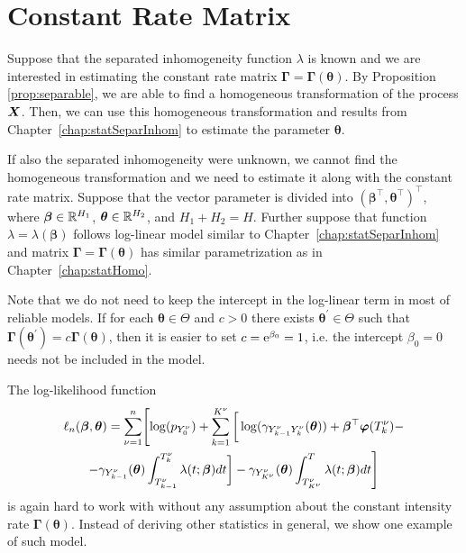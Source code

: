 {\section{Constant Rate Matrix}

Suppose that the separated inhomogeneity function $\lambda$ is known and we are interested in estimating the constant rate matrix $\bm{\Gamma} = \bm{\Gamma} (\bm{\theta})$. By Proposition \ref{prop:separable}, we are able to find a homogeneous transformation of the process $\bm{X}$. Then, we can use this homogeneous transformation and results from Chapter~\ref{chap:statSeparInhom} to estimate the parameter $\bm{\theta}$.

If also the separated inhomogeneity were unknown, we cannot find the homogeneous transformation and we need to estimate it along with the constant rate matrix. Suppose that the vector parameter is divided into $(\bm{\beta}^{\top}, \bm{\theta}^{\top})^{\top}$, where $\bm{\beta} \in \mathbb{R}^{H_1}$, $\bm{\theta} \in \mathbb{R}^{H_2}$, and $H_1 + H_2 = H$. Further suppose that function $\lambda = \lambda (\bm{\beta})$ follows log-linear model similar to Chapter~\ref{chap:statSeparInhom} and matrix $\bm{\Gamma} = \bm{\Gamma} (\bm{\theta})$ has similar parametrization as in Chapter~\ref{chap:statHomo}.

Note that we do not need to keep the intercept in the log-linear term in most of reliable models. If for each $\bm{\theta} \in \Theta$ and $c > 0$ there exists $\bm{\theta}^{'} \in \Theta$ such that $\bm{\Gamma} (\bm{\theta}^{'}) = c \bm{\Gamma} ( \bm{\theta} )$, then it is easier to set $c = \operatorname{\mathrm{e}}^{\beta_0} = 1$, i.e. the intercept $\beta_0 = 0$ needs not be included in the model.

The log-likelihood function
\begin{multline*}
	\ell_n (\bm{\beta}, \bm{\theta})
	= \sum_{\nu=1}^n \Biggl[ \log( p_{Y_0^{\nu}}) +
	\sum_{k=1}^{K^{\nu}} \bigg[ \log(\gamma_{Y_{k-1}^{\nu} Y_{k}^{\nu}} (\bm{\theta})) + \bm{\beta}^\top \bm{\varphi} (T_k^{\nu}) - \\
	- \gamma_{Y_{k-1}^{\nu}} (\bm{\theta}) \int_{T_{k-1}^{\nu}}^{T_k^{\nu}} \lambda(t; \bm{\beta}) dt \bigg] -
	\gamma_{Y_{K^{\nu}}^{\nu}} (\bm{\theta}) \int_{T_{K^{\nu}}^{\nu}}^{T} \lambda(t; \bm{\beta}) dt \Biggr]
\end{multline*}
is again hard to work with without any assumption about the constant intensity rate $\bm{\Gamma} (\bm{\theta})$. Instead of deriving other statistics in general, we show one example of such model.

}
